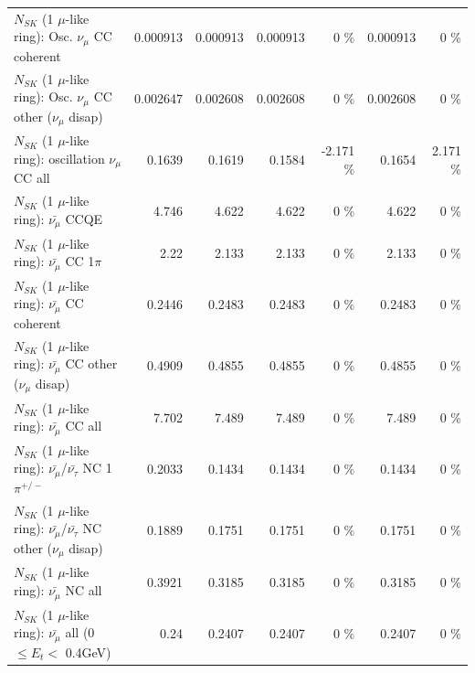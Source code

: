 \begin{table}
\begin{tabular}{| l | r | r | r  r | r  r |}
                        $N_{SK}$ (1 $\mu$-like ring): Osc. $\nu_\mu$ CC coherent &        0.000913 &        0.000913 &        0.000913 &        0 \%  &        0.000913 &        0 \%  \\ 
         $N_{SK}$ (1 $\mu$-like ring): Osc. $\nu_\mu$ CC other ($\nu_\mu$ disap) &        0.002647 &        0.002608 &        0.002608 &        0 \%  &        0.002608 &        0 \%  \\ 
                      $N_{SK}$ (1 $\mu$-like ring): oscillation $\nu_\mu$ CC all &          0.1639 &          0.1619 &          0.1584 &   -2.171 \%  &          0.1654 &    2.171 \%  \\ 
\hline
\hline
                              $N_{SK}$ (1 $\mu$-like ring): $\bar{\nu_\mu}$ CCQE &           4.746 &           4.622 &           4.622 &        0 \%  &           4.622 &        0 \%  \\ 
                         $N_{SK}$ (1 $\mu$-like ring): $\bar{\nu_\mu}$ CC 1$\pi$ &            2.22 &           2.133 &           2.133 &        0 \%  &           2.133 &        0 \%  \\ 
                       $N_{SK}$ (1 $\mu$-like ring): $\bar{\nu_\mu}$ CC coherent &          0.2446 &          0.2483 &          0.2483 &        0 \%  &          0.2483 &        0 \%  \\ 
        $N_{SK}$ (1 $\mu$-like ring): $\bar{\nu_\mu}$ CC other ($\nu_\mu$ disap) &          0.4909 &          0.4855 &          0.4855 &        0 \%  &          0.4855 &        0 \%  \\ 
                          $N_{SK}$ (1 $\mu$-like ring): $\bar{\nu_{\mu}}$ CC all &           7.702 &           7.489 &           7.489 &        0 \%  &           7.489 &        0 \%  \\ 
\hline
  $N_{SK}$ (1 $\mu$-like ring): $\bar{\nu_\mu}$/$\bar{\nu_\tau}$ NC 1$\pi^{+/-}$ &          0.2033 &          0.1434 &          0.1434 &        0 \%  &          0.1434 &        0 \%  \\ 
$N_{SK}$ (1 $\mu$-like ring): $\bar{\nu_\mu}$/$\bar{\nu_\tau}$ NC other ($\nu_\mu$ disap) &          0.1889 &          0.1751 &          0.1751 &        0 \%  &          0.1751 &        0 \%  \\ 
                          $N_{SK}$ (1 $\mu$-like ring): $\bar{\nu_{\mu}}$ NC all &          0.3921 &          0.3185 &          0.3185 &        0 \%  &          0.3185 &        0 \%  \\ 
\hline
   $N_{SK}$ (1 $\mu$-like ring): $\bar{\nu_{\mu}}$ all (0 $\leq E_{t} <$ 0.4GeV) &            0.24 &          0.2407 &          0.2407 &        0 \%  &          0.2407 &        0 \%  \\ 

\end{tabular}
\end{table}
